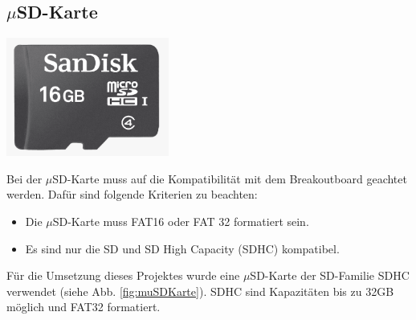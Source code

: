 \subsection{$\mu$SD-Karte}
\begin{minipage}{0.44\textwidth}
\centering
\includegraphics[width=0.4\textwidth]{graphics/Datenspeicherung/micro_sd_card_16GB.png}
\label{fig:muSDKarte}
\end{minipage}
\begin{minipage}{0.55\textwidth}
Bei der $\mu$SD-Karte muss auf die Kompatibilität mit dem Breakoutboard geachtet werden. Dafür sind folgende Kriterien zu beachten:\\
\begin{itemize}
\item Die $\mu$SD-Karte muss FAT16 oder FAT 32 formatiert sein.
\item Es sind nur die SD und SD High Capacity (SDHC) kompatibel.\\
\end{itemize}
\end{minipage}
Für die Umsetzung dieses Projektes wurde eine $\mu$SD-Karte der SD-Familie SDHC  verwendet (siehe Abb. \ref{fig:muSDKarte}). SDHC sind Kapazitäten bis zu 32GB möglich und FAT32 formatiert. \cite{muSDspez} 
\newpage


